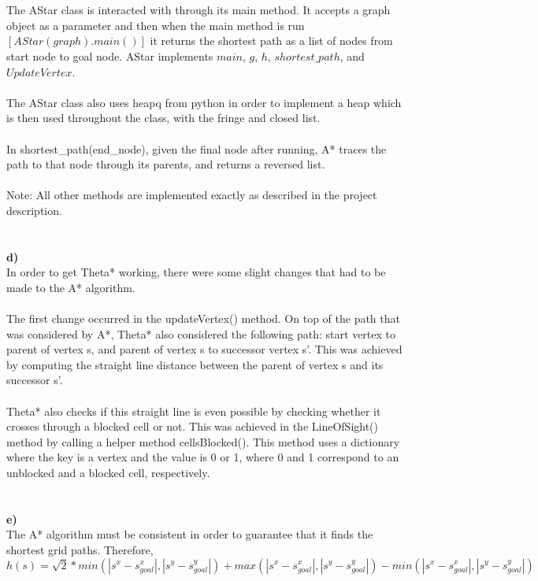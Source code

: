 \documentclass[12pt]{article}
\begin{document}
{\\
\\
The AStar class is interacted with through its main method. It accepts a graph object as a parameter and then when the main method is run $[AStar(graph).main()]$ it returns the shortest path as a list of nodes from start node to goal node. AStar implements $main$, $g$, $h$, $shortest\_path$, and $UpdateVertex$.
\\
\\
The AStar class also uses heapq from python in order to implement a heap which is then used throughout the class, with the fringe and closed list.
\\
\\
In shortest\_path(end\_node), given the final node after running, A* traces the path to that node through its parents, and returns a reversed list.
\\
\\
Note: All other methods are implemented exactly as described in the project description.
\\
\\
\\
{\bf d)}
\\
In order to get Theta* working, there were some slight changes that had to be made to the A* algorithm. 
\\
\\
The first change occurred in the updateVertex() method. On top of the path that was considered by A*, Theta* also considered the following path: start vertex to parent of vertex s, and parent of vertex s to successor vertex s'. This was achieved by computing the straight line distance between the parent of vertex s and its successor s'.
\\
\\
Theta* also checks if this straight line is even possible by checking whether it crosses through a blocked cell or not. This was achieved in the LineOfSight() method by calling a helper method cellsBlocked(). This method uses a dictionary where the key is a vertex and the value is 0 or 1, where 0 and 1 correspond to an unblocked and a blocked cell, respectively.
\\
\\
\\
{\bf e)}
\\
The A* algorithm must be consistent in order to guarantee that it finds the shortest grid paths. Therefore,
\[h(s) = \sqrt{2} * min(|s^x - s^x_{goal}|, |s^y - s^y_{goal}|) + max(|s^x - s^x_{goal}|, |s^y - s^y_{goal}|) - min(|s^x - s^x_{goal}|, |s^y - s^y_{goal}|)\]
}
\end{document}
